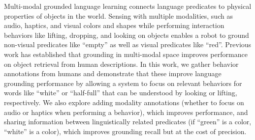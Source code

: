 Multi-modal grounded language learning connects language predicates to physical properties of objects in the world. Sensing with multiple modalities, such as audio, haptics, and visual colors and shapes while performing interaction behaviors like lifting, dropping, and looking on objects enables a robot to ground non-visual predicates like ``empty'' as well as visual predicates like ``red''. Previous work has established that grounding in multi-modal space improves performance on object retrieval from human descriptions. In this work, we gather behavior annotations from humans and demonstrate that these improve language grounding performance by allowing a system to focus on relevant behaviors for words like ``white'' or ``half-full'' that can be understood by looking or lifting, respectively. We also explore adding modality annotations (whether to focus on audio or haptics when performing a behavior), which improves performance, and sharing information between linguistically related predicates (if ``green'' is a color, ``white'' is a color), which improves grounding recall but at the cost of precision.
